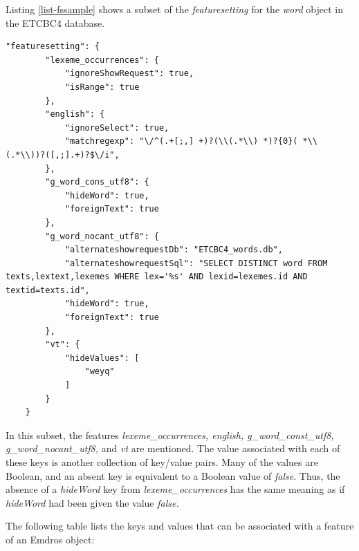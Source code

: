 \documentclass[11pt,oneside,a4paper]{memoir}
\begin{document}
Listing \ref{list-fssample} shows a subset of the \emph{featuresetting} for the \emph{word} object
in the ETCBC4 database.

\begin{lstlisting}[escapechar=\#,caption=A sample featuresetting value,label=list-fssample]
    "featuresetting": {
        "lexeme_occurrences": {
            "ignoreShowRequest": true,
            "isRange": true
        },
        "english": {
            "ignoreSelect": true,
            "matchregexp": "\/^(.+[;,] +)?(\\(.*\\) *)?{0}( *\\(.*\\))?([,;].+)?$\/i",
        },
        "g_word_cons_utf8": {
            "hideWord": true,
            "foreignText": true
        },
        "g_word_nocant_utf8": {
            "alternateshowrequestDb": "ETCBC4_words.db",
            "alternateshowrequestSql": "SELECT DISTINCT word FROM texts,lextext,lexemes WHERE lex='%s' AND lexid=lexemes.id AND textid=texts.id",
            "hideWord": true,
            "foreignText": true
        },
        "vt": {
            "hideValues": [
                "weyq"
            ]
        }
    }
\end{lstlisting}

In this subset, the features \emph{lexeme\_occurrences, english, g\_word\_const\_utf8,
  g\_word\_nocant\_utf8,} and \emph{vt} are mentioned. The value associated with each of these keys is
another collection of key/value pairs. Many of the values are Boolean, and an absent key is
equivalent to a Boolean value of \emph{false}. Thus, the absence of a \emph{hideWord} key from
\emph{lexeme\_occurrences} has the same meaning as if \emph{hideWord} had been given the value
\emph{false.}

The following table lists the keys and values that can be associated with a feature of an Emdros
object:
\end{document}
